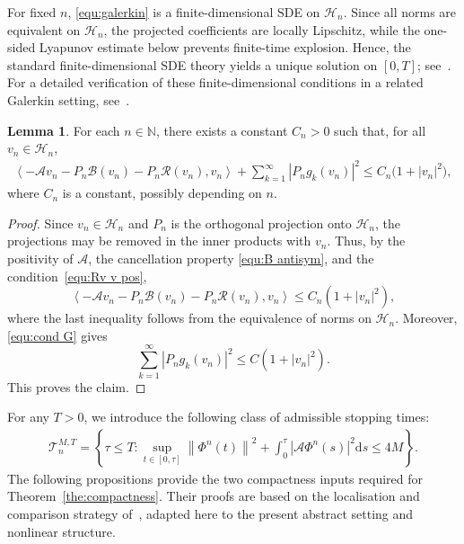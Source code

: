 \documentclass[11pt, reqno]{amsart}
\theoremstyle{definition}
\newtheorem{lemma}[theorem]{Lemma}
\numberwithin{equation}{section}
\newcommand{\bb}{\mathbb}
\newcommand{\ds}{\mathrm{d}s}
\newcommand{\norm}[1]{\left\|{#1}\right\|}
\newcommand{\inpro}[2]{\left\langle#1,#2\right\rangle}
\newcommand{\abs}[1]{\left|{#1}\right|}
\begin{document}
For fixed $n$, \eqref{equ:galerkin} is a finite-dimensional SDE on
$\mathcal H_n$. Since all norms are equivalent on $\mathcal H_n$, the
projected coefficients are locally Lipschitz, while the one-sided Lyapunov estimate
below prevents finite-time explosion. Hence, the standard finite-dimensional
SDE theory yields a unique solution on $[0,T]$; see~\cite[Chapter~10]{ChuWil14}. For a detailed verification of these finite-dimensional conditions in a related Galerkin setting, see~\cite{GolSoeTra26}.

\begin{lemma}
	For each $n\in \bb{N}$, there exists a constant $C_n>0$ such that, for all $v_n\in \mathcal{H}_n$,
	\begin{align*}
		\inpro{-\mathcal{A}v_n- P_n\mathcal{B}(v_n)- P_n\mathcal{R}(v_n)}{v_n} + \sum_{k=1}^\infty \abs{P_n g_k(v_n)}^2 \leq C_n\big(1+ \abs{v_n}^2 \big),
	\end{align*}
	where $C_n$ is a constant, possibly depending on $n$.
\end{lemma}

\begin{proof}
	Since $v_n\in\mathcal H_n$ and $P_n$ is the orthogonal projection onto
	$\mathcal H_n$, the projections may be removed in the inner products with
	$v_n$. Thus, by the positivity of $\mathcal A$, the cancellation property
	\eqref{equ:B antisym}, and the condition~\eqref{equ:Rv v pos},
	\[
	\inpro{
		-\mathcal A v_n
		-
		P_n\mathcal B(v_n)
		-
		P_n\mathcal R(v_n)}{v_n}
	\leq
	C_n(1+\abs{v_n}^2),
	\]
	where the last inequality follows from the equivalence of norms on
	$\mathcal H_n$.
	Moreover, \eqref{equ:cond G} gives
	\[
	\sum_{k=1}^\infty \abs{P_n g_k(v_n)}^2
	\leq
	C(1+\abs{v_n}^2).
	\]
	This proves the claim.
\end{proof}

For any $T>0$, we introduce the following class of admissible stopping times:
\begin{align}\label{equ:Tn MT}
	\mathcal{T}_n^{M,T}= \left\{ \tau\leq T: \sup_{t\in [0,\tau]} \norm{\Phi^n(t)}^2 + \int_0^\tau \abs{\mathcal{A}\Phi^n(s)}^2 \ds  \leq 4M \right\}.
\end{align}
The following propositions provide the two compactness inputs required for
Theorem~\ref{the:compactness}. Their proofs are based on the localisation
and comparison strategy of~\cite{GlaTem11,GlaZia09}, adapted here
to the present abstract setting and nonlinear structure.
\end{document}
